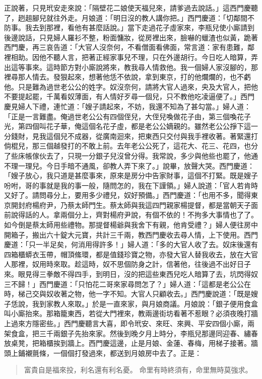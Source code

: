 正說著，只見玳安走來說：「隔壁花二娘使天福兒來，請爹過去說話。」這西門慶聽了，趔趄腳兒就往外走。月娘道：「明日沒的教人講你把。」西門慶道：「切鄰間不防事。我去到那裡，看他有甚麼話說。」當下走過花子虛家來，李瓶兒使小廝請到後邊說話，只見婦人羅衫不整，粉面慵妝，從房裡出來，臉嚇的蠟渣也似黃，跪著西門慶，再三哀告道：「大官人沒奈何，不看僧面看佛面，常言道：家有患難，鄰裡相助。因他不聽人言，把著正經家事兒不理，只在外邊胡行。今日吃人暗算，弄出這等事來。這時節方對小廝說將來，教我尋人情救他。我一個婦人家沒腳的，那裡尋那人情去。發狠起來，想著他恁不依說，拿到東京，打的他爛爛的，也不虧他。只是難為過世老公公的姓字。奴沒奈何，請將大官人過來，央及大官人，把他不要提起罷，千萬看奴薄面，有人情好歹尋一個兒，只不教他吃凌逼便了。」西門慶見婦人下禮，連忙道：「嫂子請起來，不妨，我還不知為了甚勾當。」婦人道：「正是一言難盡。俺過世老公公有四個侄兒，大侄兒喚做花子由，第三個喚花子光，第四個叫花子華，俺這個名花子虛，都是老公公嫡親的。雖然老公公掙下這一分錢財，見我這個兒不成器，從廣南迴來，把東西只交付與我手裡收著。著緊還打倘棍兒，那三個越發打的不敢上前。去年老公公死了，這花大、花三、花四，也分了些床帳傢伙去了，只現一分銀子兒沒曾分得。我常說，多少與他些也罷了，他通不理一理兒。今日手暗不通風，卻教人弄下來了。」說畢，放聲大哭。西門慶道：「嫂子放心，我只道是甚麼事來，原來是房分中告家財事，這個不打緊。既是嫂子吩咐，哥的事就是我的事一般，隨問怎的，我在下謹領。」婦人說道：「官人若肯時又好了。請問尋分上，要用多少禮兒，奴好預備。」西門慶道：「也用不多，聞得東京開封府楊府尹，乃蔡太師門生。蔡太師與我這四門親家楊提督，都是當朝天子面前說得話的人。拿兩個分上，齊對楊府尹說，有個不依的！不拘多大事情也了了。如今倒是蔡太師用些禮物。那提督楊爺與我舍下有親，他肯受禮？」婦人便往房中開箱子，搬出六十錠大元寶，共計三千兩，教西門慶收去尋人情，上下使用。西門慶道：「只一半足矣，何消用得許多！」婦人道：「多的大官人收了去。奴床後還有四箱櫃蟒衣玉帶，帽頂絛環，都是值錢珍寶之物，亦發大官人替我收去，放在大官人那裡，奴用時來取。趁這時，奴不思個防身之計，信著他，往後過不出好日子來。眼見得三拳敵不得四手，到明日，沒的把這些東西兒吃人暗算了去，坑閃得奴三不歸！」西門慶道：「只怕花二哥來家尋問怎了？」婦人道：「這都是老公公在時，梯己交與奴收著之物，他一字不知。大官人只顧收去。」西門慶說道：「既是嫂子恁說，我到家教人來取。」於是一直來家，與月娘商議。月娘說：「銀子便用食盒叫小廝抬來。那箱籠東西，若從大門裡來，教兩邊街坊看著不惹眼？必須夜晚打牆上過來方隱密些。」西門慶聽言大喜，即令玳安、來旺、來興、平安四個小廝，兩架食盒，把三千兩銀子先抬來家。然後到晚夕月上時分，李瓶兒那邊同迎春、繡春放桌凳，把箱櫃挨到牆上。西門慶這邊，止是月娘、金蓮、春梅，用梯子接著。牆頭上鋪襯氈條，一個個打發過來，都送到月娘房中去了。正是：
\begin{quote}
富貴自是福來投，利名還有利名憂。
命里有時終須有，命里無時莫強求。
\end{quote}

